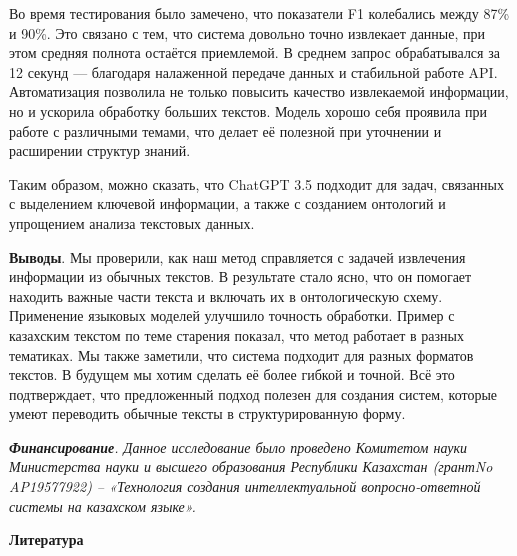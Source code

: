 \begin{multicols}{2}
Во время тестирования было замечено, что показатели F1 колебались между
87\% и 90\%. Это связано с тем, что система довольно точно извлекает
данные, при этом средняя полнота остаётся приемлемой. В среднем запрос
обрабатывался за 12 секунд --- благодаря налаженной передаче данных и
стабильной работе API. Автоматизация позволила не только повысить
качество извлекаемой информации, но и ускорила обработку больших
текстов. Модель хорошо себя проявила при работе с различными темами, что
делает её полезной при уточнении и расширении структур знаний.

Таким образом, можно сказать, что ChatGPT 3.5 подходит для задач,
связанных с выделением ключевой информации, а также с созданием
онтологий и упрощением анализа текстовых данных.

{\bfseries Выводы}. Мы проверили, как наш метод справляется с задачей
извлечения информации из обычных текстов. В результате стало ясно, что
он помогает находить важные части текста и включать их в онтологическую
схему. Применение языковых моделей улучшило точность обработки. Пример с
казахским текстом по теме старения показал, что метод работает в разных
тематиках. Мы также заметили, что система подходит для разных форматов
текстов. В будущем мы хотим сделать её более гибкой и точной. Всё это
подтверждает, что предложенный подход полезен для создания систем,
которые умеют переводить обычные тексты в структурированную форму.

\emph{{\bfseries Финансирование}. Данное исследование было проведено
Комитетом науки Министерства науки и высшего образования Республики
Казахстан (грантNo AP19577922) -- «Технология создания интеллектуальной
вопросно-ответной системы на казахском языке».}
\end{multicols}

\begin{center}
{\bfseries Литература}
\end{center}

